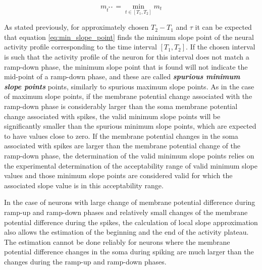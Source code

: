 \begin{equation}
\label{eq:min_slope_point}
m_{t^{**}}=\min_{t\in[T_{1},T_{2}]}m_{t}
\end{equation}

As stated previously, for approximately chosen $T_{2}-T_{1}$ and $\tau$ it can be expected that equation \ref{eq:min_slope_point} finds the minimum slope point of the neural activity profile corresponding to the time interval $[T_{1},T_{2}]$. If the chosen interval is such that the activity profile of the neuron for this interval does not match a ramp-down phase, the minimum slope point that is found will not indicate the mid-point of a ramp-down phase, and these are called \textbf{\textit{spurious minimum slope points}} points, similarly to spurious maximum slope points. As in the case of maximum slope points, if the membrane potential change associated with the ramp-down phase is considerably larger than the soma membrane potential change associated with spikes, the valid minimum slope points will be significantly smaller than the spurious minimum slope points, which are expected to have values close to zero. If the membrane potential changes in the soma associated with spikes are larger than the membrane potential change of the ramp-down phase, the determination of the valid minimum slope points relies on the experimental determination of the acceptability range of valid minimum slope values and those minimum slope points are considered valid for which the associated slope value is in this acceptability range.

In the case of neurons with large change of membrane potential difference during ramp-up and ramp-down phases and relatively small changes of the membrane potential difference during the spikes, the calculation of local slope approximation also allows the estimation of the beginning and the end of the activity plateau. The estimation cannot be done reliably for neurons where the membrane potential difference changes in the soma during spiking are much larger than the changes during the ramp-up and ramp-down phases.

